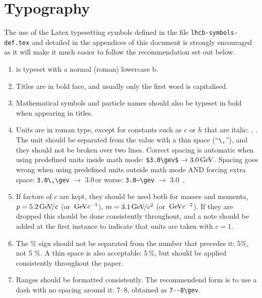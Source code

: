 \section{Typography}
\label{sec:typography}

The use of the Latex typesetting symbols defined in the file
\texttt{lhcb-symbols-def.tex} and detailed in the appendices of this
document is strongly encouraged as it will make it much easier to
follow the recommendation set out below.

\begin{enumerate}

\item \lhcb is typeset with a normal (roman) lowercase b.

\item Titles are in bold face, and usually only the first word is
  capitalised.

\item Mathematical symbols and particle names should also be typeset
  in bold when appearing in titles.

\item Units are in roman type, except for constants such as $c$ or $h$
  that are italic: \gev, \gevcc.  The unit should be separated from
  the value with a thin space (``\verb!\,!''),
  and they should not be broken over two lines.
  Correct spacing is automatic when using predefined units inside math mode: \verb!$3.0\gev$! $\rightarrow 3.0\mathrm{\,Ge\kern -0.1em V}$.
  Spacing goes wrong when using predefined units outside math mode AND forcing extra space:
  \verb!3.0\,\gev! $\to$ 3.0\,\gev or worse:   \verb!3.0~\gev! $\to$ 3.0~\gev. 

\item  If factors of $c$ are kept, they should be used both for masses and
  momenta, \eg $p=5.2{\mathrm{\,Ge\kern -0.1em V\!/}c}$ (or $\mathrm{\,Ge\kern -0.1em V} c^{-1}$), $m = 3.1{\mathrm{\,Ge\kern -0.1em V\!/}c^2}$ (or $\mathrm{\,Ge\kern -0.1em V} c^{-2}$). If they are dropped this
  should be done consistently throughout, and a note should be added
  at the first instance to indicate that units are taken with $c=1$.

\item The \% sign should not be separated from the number that precedes it: 5\%, not 5 \%. 
A thin space is also acceptable: 5\,\%, but should be applied consistently throughout the paper.

\item Ranges should be formatted consistently. The recommendend form is to use a dash with no spacing around it: 
7--8\gev, obtained as \verb!7--8\gev!. 


\end{enumerate}
